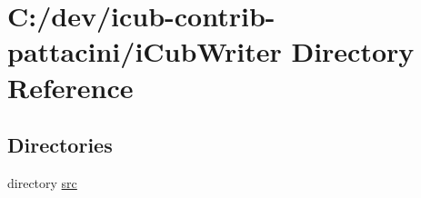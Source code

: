 \section{C\+:/dev/icub-\/contrib-\/pattacini/i\+Cub\+Writer Directory Reference}
\label{dir_98b4e207a12399df8378bc42de475b90}
\subsection*{Directories}
\begin{DoxyCompactItemize}
\item 
directory \hyperlink{dir_f1ef2ffd0c7783f972704006ec9d595c}{src}
\end{DoxyCompactItemize}
